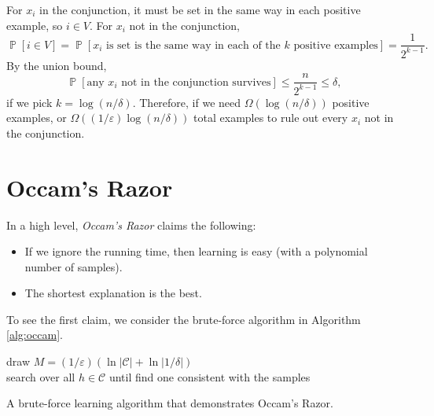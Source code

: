 \documentclass[letterpaper, reqno,11pt]{article}
\newcommand{\PP}{\mathop{{}\mathbb{P}}}
\begin{document}
For $x_i$ in the conjunction, it must be set in the same way in each positive example, so $i \in V$. For $x_i$ not in the conjunction,
$$ \PP[i \in V] = \PP\left[\text{$x_i$ is set is the same way in each of the $k$ positive examples}\right] = \frac{1}{2^{k - 1}}. $$
By the union bound,
$$ \PP\left[\text{any $x_i$ not in the conjunction survives}\right] \leq \frac{n}{2^{k - 1}} \leq \delta, $$
if we pick $k = \log (n/\delta)$. Therefore, if we need $\Omega(\log(n/\delta))$ positive examples, or $\Omega((1/\varepsilon) \log(n/\delta))$ total examples to rule out every $x_i$ not in the conjunction.

\section{Occam's Razor}

In a high level, \emph{Occam's Razor} claims the following:
\begin{itemize}[itemsep=0pt]
  \item If we ignore the running time, then learning is easy (with a polynomial number of samples).
  \item The shortest explanation is the best.
\end{itemize}
To see the first claim, we consider the brute-force algorithm in Algorithm \ref{alg:occam}.

\begin{algorithm}
  draw $M = (1/\varepsilon) (\ln |\mathcal C| + \ln |1/\delta|)$ \\
  search over all $h \in \mathcal C$ until find one consistent with the samples \\
  \caption{A brute-force learning algorithm that demonstrates Occam's Razor.}
  \label{alg:occam}
\end{algorithm}
\end{document}

